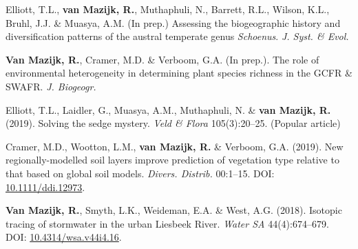 \begin{hangparas}{2em}{1}

Elliott, T.L., \textbf{van Mazijk, R.}, Muthaphuli, N., Barrett, R.L., Wilson, K.L., Bruhl, J.J. \& Muasya, A.M. (In prep.) Assessing the biogeographic history and diversification patterns of the austral temperate genus \textit{Schoenus}. \textit{J. Syst. \& Evol.}

\textbf{Van Mazijk, R.}, Cramer, M.D. \& Verboom, G.A. (In prep.). The role of
environmental heterogeneity in determining plant species richness in the GCFR \&
SWAFR. \textit{J. Biogeogr.}

Elliott, T.L., Laidler, G., Muasya, A.M., Muthaphuli, N. \& \textbf{van Mazijk, 
R.} (2019). Solving the sedge mystery. \textit{Veld \& Flora} 105(3):20--25.
(Popular article)

Cramer, M.D., Wootton, L.M., \textbf{van Mazijk, R.} \& Verboom, G.A. (2019).
New regionally-modelled soil layers improve prediction of vegetation type
relative to that based on global soil models. \textit{Divers. Distrib.}
00:1--15. DOI: \href{https://doi.org/10.1111/ddi.12973}{10.1111/ddi.12973}.

\textbf{Van Mazijk, R.}, Smyth, L.K., Weideman, E.A. \& West, A.G. (2018).
Isotopic tracing of stormwater in the urban Liesbeek River. \textit{Water SA}
44(4):674--679. DOI:
\href{https://doi.org/10.4314/wsa.v44i4.16}{10.4314/wsa.v44i4.16}.

\end{hangparas}
